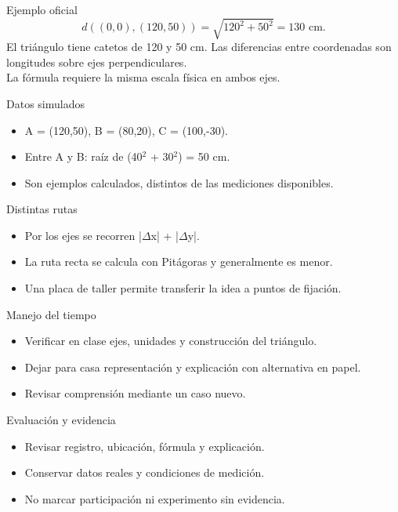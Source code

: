 \documentclass[
	spanish,
	aspectratio=1610,
	xcolor={dvipsnames,table}
]{beamer}
\begin{document}
\begin{frame}{Ejemplo oficial}
\fontsize{14}{18}\selectfont\[d((0,0),(120,50))=\sqrt{120^2+50^2}=130\text{ cm}.\]
\vspace{.4cm}El triángulo tiene catetos de 120 y 50 cm. Las diferencias entre coordenadas son longitudes sobre ejes perpendiculares.\\[.4cm]La fórmula requiere la misma escala física en ambos ejes.
\end{frame}
\begin{frame}{Datos simulados}
\fontsize{14}{18}\selectfont\begin{itemize}\setlength{\itemsep}{.45cm}
\item A = (120,50), B = (80,20), C = (100,-30).
\item Entre A y B: raíz de (40$^2$ + 30$^2$) = 50 cm.
\item Son ejemplos calculados, distintos de las mediciones disponibles.
\end{itemize}
\end{frame}
\begin{frame}{Distintas rutas}
\fontsize{14}{18}\selectfont\begin{itemize}\setlength{\itemsep}{.45cm}
\item Por los ejes se recorren |$\Delta$x| + |$\Delta$y|.
\item La ruta recta se calcula con Pitágoras y generalmente es menor.
\item Una placa de taller permite transferir la idea a puntos de fijación.
\end{itemize}
\end{frame}
\begin{frame}{Manejo del tiempo}
\fontsize{14}{18}\selectfont\begin{itemize}\setlength{\itemsep}{.45cm}
\item Verificar en clase ejes, unidades y construcción del triángulo.
\item Dejar para casa representación y explicación con alternativa en papel.
\item Revisar comprensión mediante un caso nuevo.
\end{itemize}
\end{frame}
\begin{frame}{Evaluación y evidencia}
\fontsize{14}{18}\selectfont\begin{itemize}\setlength{\itemsep}{.45cm}
\item Revisar registro, ubicación, fórmula y explicación.
\item Conservar datos reales y condiciones de medición.
\item No marcar participación ni experimento sin evidencia.
\end{itemize}
\end{frame}
\end{document}
